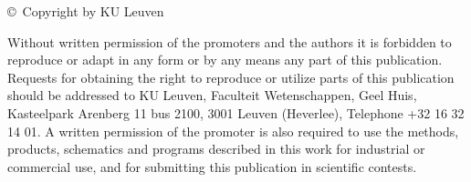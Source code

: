 \thispagestyle{empty}
\setlength{\parindent}{0cm}
\vspace*{\fill}

\begin{smallfont}
\copyright\ Copyright by KU Leuven \par
Without written permission of the promoters and the authors it is forbidden to reproduce or adapt in any form or by any means any part of this publication. Requests for obtaining the right to reproduce or utilize parts of this publication should be addressed to KU Leuven, Faculteit Wetenschappen, Geel Huis, Kasteelpark Arenberg 11 bus 2100, 3001 Leuven (Heverlee), Telephone +32 16 32 14 01.
A written permission of the promoter is also required to use the methods, products, schematics and programs described in this work for industrial or commercial use, and for submitting this publication in scientific contests.
\end{smallfont}

\setlength{\parindent}{0.5cm}
